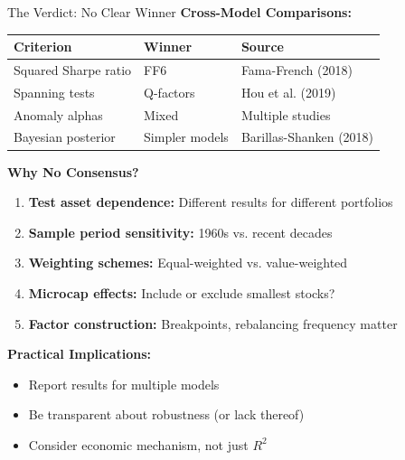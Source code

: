 \documentclass{beamer}
\begin{document}
\begin{frame}{The Verdict: No Clear Winner}
    \textbf{Cross-Model Comparisons:}
    
    \begin{table}
        \footnotesize
        \begin{tabular}{p{3cm}|p{2.5cm}|p{2.5cm}}
            \hline
            \textbf{Criterion} & \textbf{Winner} & \textbf{Source} \\
            \hline
            Squared Sharpe ratio & FF6 & Fama-French (2018) \\
            Spanning tests & Q-factors & Hou et al. (2019) \\
            Anomaly alphas & Mixed & Multiple studies \\
            Bayesian posterior & Simpler models & Barillas-Shanken (2018) \\
            \hline
        \end{tabular}
    \end{table}
    
    
    \textbf{Why No Consensus?}
    \begin{enumerate}
        \item \textbf{Test asset dependence:} Different results for different portfolios
        \item \textbf{Sample period sensitivity:} 1960s vs. recent decades
        \item \textbf{Weighting schemes:} Equal-weighted vs. value-weighted
        \item \textbf{Microcap effects:} Include or exclude smallest stocks?
        \item \textbf{Factor construction:} Breakpoints, rebalancing frequency matter
    \end{enumerate}
    
    
    \textbf{Practical Implications:}
    \begin{itemize}
        \item Report results for multiple models
        \item Be transparent about robustness (or lack thereof)
        \item Consider economic mechanism, not just $R^2$
    \end{itemize}
\end{frame}

\end{document}
